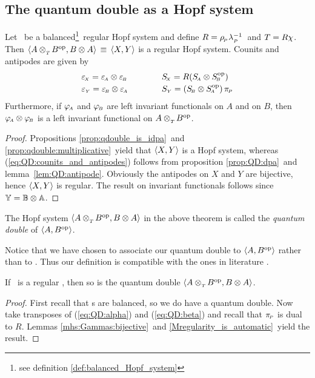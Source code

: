 
\subsection{The quantum double as a Hopf system}

\begin{thm}
Let\/ \pairAB\ be a balanced\footnote{see definition \ref{def:balanced_Hopf_system}}\
regular Hopf system and define\/
\mbox{$R=\rho_{_{\!P}}\lambda_{_P\!}^{-1}$}\ and\/ $T=R\chi$. Then\/
$\langle A \otimes_{_T\!} B^{\rm op},B \otimes A \rangle \,\equiv\, \langle X,Y \rangle$
is a regular Hopf system.
Counits and antipodes are given by
\begin{equation}\label{eq:QD:counits_and_antipodes}
\begin{array}{lcl}
  \epsX = \epsA \tens \epsB   &\hspace{2em}&  \SX = R(\SA \tens \SB\op)    \\
  \epsY = \epsB \tens \epsA   &            &  \SY = (\SB \tens \SA\op)\, \piP \vertL
\end{array}
\end{equation}
Furthermore, if\/ $\varphi_{\!\scriptscriptstyle A}$ and\/ $\varphi_{\scriptscriptstyle \! B}$ are left invariant functionals on\/ $A$ and on\/ $B$,
then\/ $\varphi_{\!\scriptscriptstyle A} \otimes \varphi_{\scriptscriptstyle \! B}$ is a left invariant functional on\/ $A \otimes_{_T\!} B^{\rm op}$.
\end{thm}


\begin{proof}
Propositions \ref{prop:qdouble_is_idpa}\ and \ref{prop:qdouble:multiplicative}\
yield that $\langle X,Y \rangle$ is a Hopf system, whereas
(\ref{eq:QD:counits_and_antipodes}) follows from
proposition \ref{prop:QD:dpa}\ and \mbox{lemma \ref{lem:QD:antipode}}\@.
Obviously the antipodes on $X$ and $Y$ are bijective,
hence $\langle X,Y \rangle$ is regular.
The result on invariant functionals follows since $\mathbb{Y} = \mathbb{B} \otimes \mathbb{A}$.
\end{proof}


\begin{defn}
The Hopf system $\langle A \otimes_{_T\!} B^{\rm op},B \otimes A \rangle$ in the above theorem
is called the {\em quantum double\/} of $\langle A,B^{\rm op} \rangle$.
\end{defn}

{\small
Notice that we have chosen to associate our quantum double to $\langle A,B^{\rm op} \rangle$ rather
than to \pairAB\@. Thus our definition is compatible with the ones in
literature \cite{Schmudgen,Majid,FonsSabine}\@.}



\begin{prop} \label{prop:QD:rmhs}
If\/ \pairAB\ is a regular \mhs,
then so is the quantum double\/ $\langle A \otimes_{_T\!} B^{\rm op},B \otimes A \rangle$.
\end{prop}
\begin{proof}
First recall that \mhs s are balanced, so we do have a quantum double.
Now take transposes of (\ref{eq:QD:alpha}) and (\ref{eq:QD:beta})
and recall that $\pi_{\scriptscriptstyle \! P}$ is dual to $R$.
Lemmas \ref{mhs:Gammas:bijective}\ and \ref{Mregularity_is_automatic}\
yield the result.
\end{proof}


